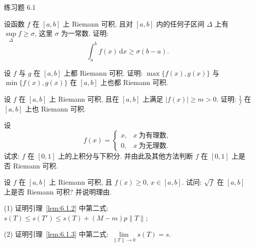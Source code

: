 \begin{exblock}{练习题 6.1}
  \item 设函数 $f$ 在 $[a,b]$ 上 Riemann 可积, 且对 $[a,b]$ 内的任何子区间 $\Delta$ 上有 $\sup\limits_{\Delta}f\geqslant\sigma$, 这里 $\sigma$ 为一常数. 证明:
  \[
  \int_{a}^{b}f(x)\,\mathrm{d}x\geqslant\sigma(b-a).
\]

  \item 设 $f$ 与 $g$ 在 $[a,b]$ 上都 Riemann 可积. 证明: $\max\{f(x),g(x)\}$ 与 $\min\{f(x),g(x)\}$ 在 $[a,b]$ 上也都 Riemann 可积.

  \item 设 $f$ 在 $[a,b]$ 上 Riemann 可积, 且在 $[a,b]$ 上满足 $|f(x)|\geqslant m>0$. 证明: $\frac{1}{f}$ 在 $[a,b]$ 上也 Riemann 可积.

  \item 设
  \[
  f(x)=\begin{cases}x,&x\ \text{为有理数},\\0,&x\ \text{为无理数}.\end{cases}
\]
  试求: $f$ 在 $[0,1]$ 上的上积分与下积分. 并由此及其他方法判断 $f$ 在 $[0,1]$ 上是否 Riemann 可积.

  \item 设 $f$ 在 $[a,b]$ 上 Riemann 可积, 且 $f(x)\geqslant 0$, $x\in[a,b]$. 试问: $\sqrt{f}$ 在 $[a,b]$ 上是否 Riemann 可积? 并说明理由.

  \item (1) 证明引理~\ref{lem:6.1.2} 中第二式: $s(T)\leqslant s(T')\leqslant s(T)+(M-m)p\|T\|$;

  (2) 证明引理~\ref{lem:6.1.3} 中第二式: $\lim\limits_{\|T\|\to 0}s(T)=s$.
\end{exblock}

